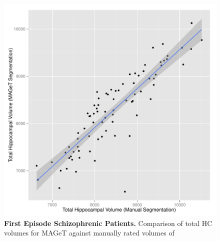 \documentclass{article}\usepackage{graphicx, color}
\makeatletter
\def\maxwidth{ %
  \ifdim\Gin@nat@width>\linewidth
    \linewidth
  \else
    \Gin@nat@width
  \fi
}
\newenvironment{knitrout}{}{} %
\makeatother
\begin{document}
\begin{figure}[h]
\begin{knitrout}
\color{fgcolor}

{\centering \includegraphics[width=\maxwidth]{figure/SZ_volumes} 

}


\end{knitrout}

  \caption{{\bf First Episode Schizophrenic Patients.} Comparison of total HC volumes for MAGeT against manually rated volumes of}
  \label{SZ_volumes}
\end{figure}
\end{document}
